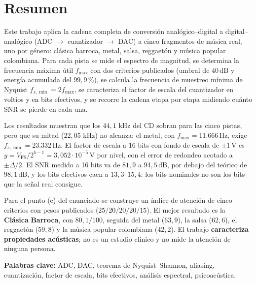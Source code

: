 \documentclass[11pt,a4paper]{article}
\newcommand{\fsmin}{f_{s,\min}}
\newcommand{\fmax}{f_{\max}}
\newcommand{\Vfs}{V_{\mathrm{FS}}}
\newcommand{\dd}{\Delta}
\newcommand{\dB}{\,\mathrm{dB}}
\newcommand{\Hz}{\,\mathrm{Hz}}
\newcommand{\V}{\,\mathrm{V}}
\begin{document}
\section*{Resumen}

Este trabajo aplica la cadena completa de conversión analógico--digital a
digital--analógico (ADC \(\to\) cuantizador \(\to\) DAC) a cinco fragmentos de
música real, uno por género: clásica barroca, metal, salsa, reggaetón y música
popular colombiana. Para cada pista se mide el espectro de magnitud, se
determina la frecuencia máxima útil \(\fmax\) con dos criterios publicados
(umbral de \(40\dB\) y energía acumulada del \(99{,}9\)\,\%), se calcula la
frecuencia de muestreo mínima de Nyquist \(\fsmin = 2\fmax\), se caracteriza el
factor de escala del cuantizador en voltios y en bits efectivos, y se recorre
la cadena etapa por etapa midiendo cuánto SNR se pierde en cada una.

Los resultados muestran que los \(44{,}1\) kHz del CD sobran para las cinco
pistas, pero que su mitad (\(22{,}05\) kHz) no alcanza: el metal, con
\(\fmax = 11.666\Hz\), exige \(\fsmin = 23.332\Hz\). El factor de escala a
16 bits con fondo de escala de \(\pm1\V\) es
\(y = \Vfs/2^{b-1} = 3{,}052\cdot10^{-5}\V\) por nivel, con el error de
redondeo acotado a \(\pm\dd/2\). El SNR medido a 16 bits va de \(81{,}9\) a
\(94{,}5\dB\), por debajo del teórico de \(98{,}1\dB\), y los bits efectivos
caen a \(13{,}3\)--\(15{,}4\): los bits nominales no son los bits que la señal
real consigue.

Para el punto (e) del enunciado se construye un índice de atención de cinco
criterios con pesos publicados (\(25/20/20/20/15\)). El mejor resultado es la
\textbf{Clásica\,\textperiodcentered{}\,Barroca}, con \(80{,}1/100\), seguida del metal
(\(63{,}9\)), la salsa (\(62{,}6\)), el reggaetón (\(59{,}8\)) y la música
popular colombiana (\(42{,}2\)). El trabajo \textbf{caracteriza propiedades
acústicas}; no es un estudio clínico y no mide la atención de ninguna persona.

\vspace{0.6cm}
\noindent\textbf{Palabras clave:} ADC, DAC, teorema de Nyquist--Shannon,
aliasing, cuantización, factor de escala, bits efectivos, análisis espectral,
psicoacústica.

\newpage
\tableofcontents
\newpage

\end{document}
